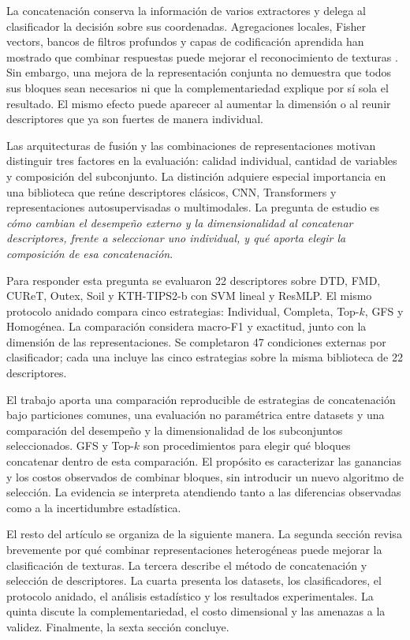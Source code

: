 \documentclass[a4paper,fleqn]{cas-sc}
\begin{document}
La concatenación conserva la información de varios extractores y delega al clasificador la decisión sobre sus coordenadas. Agregaciones locales, Fisher vectors, bancos de filtros profundos y capas de codificación aprendida han mostrado que combinar respuestas puede mejorar el reconocimiento de texturas \citep{sanchez2013image,cimpoi2016fisher,zhang2017deepten}. Sin embargo, una mejora de la representación conjunta no demuestra que todos sus bloques sean necesarios ni que la complementariedad explique por sí sola el resultado. El mismo efecto puede aparecer al aumentar la dimensión o al reunir descriptores que ya son fuertes de manera individual.

Las arquitecturas de fusión y las combinaciones de representaciones motivan distinguir tres factores en la evaluación: calidad individual, cantidad de variables y composición del subconjunto. La distinción adquiere especial importancia en una biblioteca que reúne descriptores clásicos, CNN, Transformers y representaciones autosupervisadas o multimodales. La pregunta de estudio es \emph{cómo cambian el desempeño externo y la dimensionalidad al concatenar descriptores, frente a seleccionar uno individual, y qué aporta elegir la composición de esa concatenación}.

Para responder esta pregunta se evaluaron 22 descriptores sobre DTD, FMD, CUReT, Outex, Soil y KTH-TIPS2-b con SVM lineal y ResMLP. El mismo protocolo anidado compara cinco estrategias: Individual, Completa, Top-$k$, GFS y Homogénea. La comparación considera macro-F1 y exactitud, junto con la dimensión de las representaciones. Se completaron 47 condiciones externas por clasificador; cada una incluye las cinco estrategias sobre la misma biblioteca de 22 descriptores.

El trabajo aporta una comparación reproducible de estrategias de concatenación bajo particiones comunes, una evaluación no paramétrica entre datasets y una comparación del desempeño y la dimensionalidad de los subconjuntos seleccionados. GFS y Top-$k$ son procedimientos para elegir qué bloques concatenar dentro de esta comparación. El propósito es caracterizar las ganancias y los costos observados de combinar bloques, sin introducir un nuevo algoritmo de selección. La evidencia se interpreta atendiendo tanto a las diferencias observadas como a la incertidumbre estadística.

El resto del artículo se organiza de la siguiente manera. La segunda sección revisa brevemente por qué combinar representaciones heterogéneas puede mejorar la clasificación de texturas. La tercera describe el método de concatenación y selección de descriptores. La cuarta presenta los datasets, los clasificadores, el protocolo anidado, el análisis estadístico y los resultados experimentales. La quinta discute la complementariedad, el costo dimensional y las amenazas a la validez. Finalmente, la sexta sección concluye.
\end{document}
